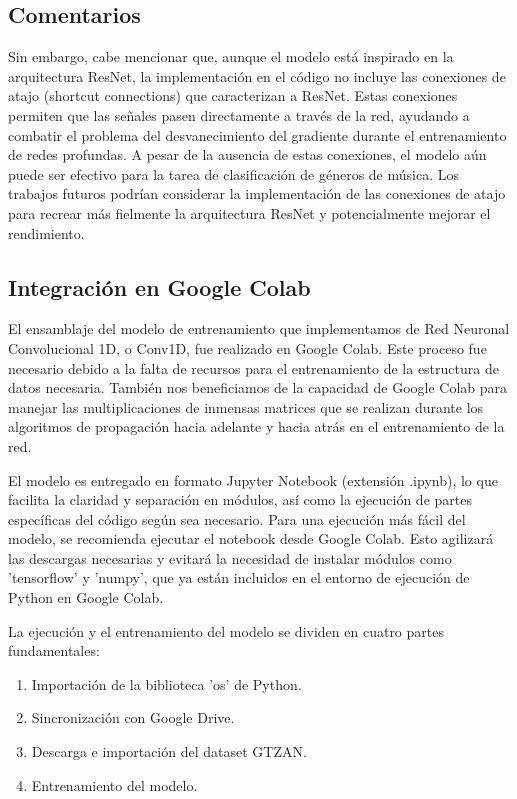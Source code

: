 \documentclass[colorinlistoftodos,twoside,twocolumn,10pt]{article} %
\begin{document}
\subsection{Comentarios}
Sin embargo, cabe mencionar que, aunque el modelo está inspirado en la arquitectura ResNet, la implementación en el código no incluye las conexiones de atajo (shortcut connections) que caracterizan a ResNet. Estas conexiones permiten que las señales pasen directamente a través de la red, ayudando a combatir el problema del desvanecimiento del gradiente durante el entrenamiento de redes profundas. A pesar de la ausencia de estas conexiones, el modelo aún puede ser efectivo para la tarea de clasificación de géneros de música. Los trabajos futuros podrían considerar la implementación de las conexiones de atajo para recrear más fielmente la arquitectura ResNet y potencialmente mejorar el rendimiento.

\subsection*{Integración en Google Colab}

El ensamblaje del modelo de entrenamiento que implementamos de Red Neuronal Convolucional 1D, o Conv1D, fue realizado en Google Colab. Este proceso fue necesario debido a la falta de recursos para el entrenamiento de la estructura de datos necesaria. También nos beneficiamos de la capacidad de Google Colab para manejar las multiplicaciones de inmensas matrices que se realizan durante los algoritmos de propagación hacia adelante y hacia atrás en el entrenamiento de la red.

El modelo es entregado en formato Jupyter Notebook (extensión .ipynb), lo que facilita la claridad y separación en módulos, así como la ejecución de partes específicas del código según sea necesario. Para una ejecución más fácil del modelo, se recomienda ejecutar el notebook desde Google Colab. Esto agilizará las descargas necesarias y evitará la necesidad de instalar módulos como 'tensorflow' y 'numpy', que ya están incluidos en el entorno de ejecución de Python en Google Colab.

La ejecución y el entrenamiento del modelo se dividen en cuatro partes fundamentales:

\begin{enumerate}
\item Importación de la biblioteca 'os' de Python.
\item Sincronización con Google Drive.
\item Descarga e importación del dataset GTZAN.
\item Entrenamiento del modelo.
\end{enumerate}
\end{document}
